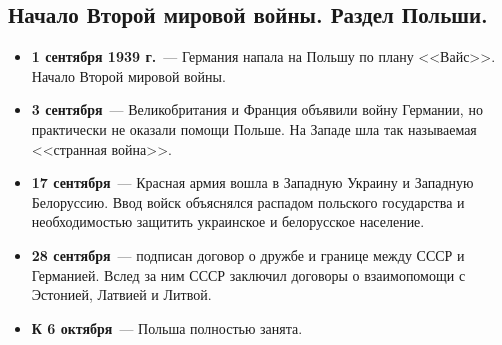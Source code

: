 \documentclass[12pt]{article}
\begin{document}
	\subsection{Начало Второй мировой войны. Раздел Польши.}
	\begin{itemize}
		\item \textbf{1 сентября 1939 г.}~--- Германия напала на Польшу по плану <<Вайс>>. Начало Второй мировой войны.
		\item \textbf{3 сентября}~--- Великобритания и Франция объявили войну Германии, но практически не оказали помощи Польше. На Западе шла так называемая <<странная война>>.
		\item \textbf{17 сентября}~--- Красная армия вошла в Западную Украину и Западную Белоруссию. Ввод войск объяснялся распадом польского государства и необходимостью защитить украинское и белорусское население.
		\item \textbf{28 сентября}~--- подписан договор о дружбе и границе между СССР и Германией. Вслед за ним СССР заключил договоры о взаимопомощи с Эстонией, Латвией и Литвой.
		\item \textbf{К 6 октября}~--- Польша полностью занята.
	\end{itemize}
\end{document}
